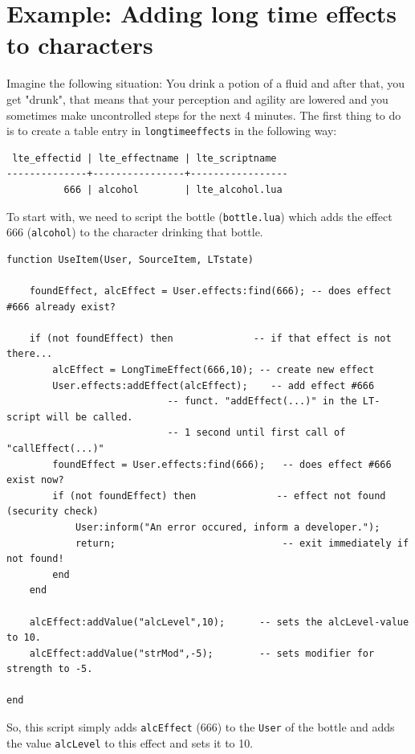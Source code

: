 \documentclass[a4paper,10pt,makeidx]{scrreprt}
\begin{document}
\section{Example: Adding long time effects to characters}
Imagine the following situation: You drink a potion of a fluid and after that, you get "drunk", that means that your perception and agility are lowered and you sometimes make uncontrolled steps for the next 4 minutes.
The first thing to do is to create a table entry in {\tt longtimeeffects} in the following way:
\begin{verbatim}
 lte_effectid | lte_effectname | lte_scriptname
--------------+----------------+-----------------
          666 | alcohol        | lte_alcohol.lua
\end{verbatim}
To start with, we need to script the bottle ({\tt bottle.lua}) which adds the effect 666 ({\tt alcohol}) to the character drinking that bottle.
\begin{verbatim}
function UseItem(User, SourceItem, LTstate)

    foundEffect, alcEffect = User.effects:find(666); -- does effect #666 already exist?

    if (not foundEffect) then              -- if that effect is not there...
        alcEffect = LongTimeEffect(666,10); -- create new effect
        User.effects:addEffect(alcEffect);    -- add effect #666
                            -- funct. "addEffect(...)" in the LT-script will be called.
                            -- 1 second until first call of "callEffect(...)"
        foundEffect = User.effects:find(666);   -- does effect #666 exist now?
        if (not foundEffect) then              -- effect not found (security check)
            User:inform("An error occured, inform a developer.");
            return;                             -- exit immediately if not found!
        end
    end

    alcEffect:addValue("alcLevel",10);      -- sets the alcLevel-value to 10.
    alcEffect:addValue("strMod",-5);        -- sets modifier for strength to -5.

end
\end{verbatim}
So, this script simply adds {\tt alcEffect} (666) to the {\tt User} of the bottle and adds the value {\tt alcLevel} to this effect and sets it to 10.
\end{document}
